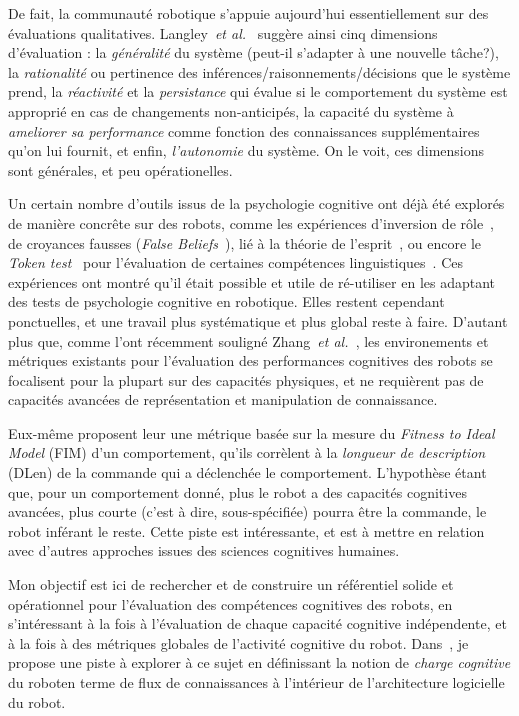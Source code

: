 \documentclass[a4paper]{article}
\newcommand{\etal}{{\textit{et al.~}}}
\begin{document}
De fait, la communauté robotique s'appuie aujourd'hui essentiellement sur des
évaluations qualitatives. Langley~\etal\cite{Langley2006} suggère ainsi cinq
dimensions d'évaluation : la \emph{généralité} du système (peut-il s'adapter à
une nouvelle tâche?), la \emph{rationalité} ou pertinence des
inférences/raisonnements/décisions que le système prend, la \emph{réactivité} et
la \emph{persistance} qui évalue si le comportement du système est approprié en
cas de changements non-anticipés, la capacité du système à \emph{ameliorer sa
performance} comme fonction des connaissances supplémentaires qu'on lui fournit,
et enfin, \emph{l'autonomie} du système. On le voit, ces dimensions sont
générales, et peu opérationelles.

Un certain nombre d'outils issus de la psychologie cognitive ont déjà été
explorés de manière concrête sur des robots, comme les expériences d'inversion
de rôle~\cite{Lallee2010b}, de croyances fausses (\emph{False
Beliefs}~\cite{Leslie2000}), lié à la théorie de l'esprit~\cite{Breazeal2006,
Warnier2012a, trafton2013act}, ou encore le \emph{Token
test}~\cite{DiSimoni1978} pour l'évaluation de certaines compétences
linguistiques~\cite{Mavridis2006}. Ces expériences ont montré qu'il était
possible et utile de ré-utiliser en les adaptant des tests de psychologie
cognitive en robotique. Elles restent cependant ponctuelles, et une travail plus
systématique et plus global reste à faire. D'autant plus que, comme l'ont
récemment souligné Zhang~\etal\cite{zhang2013evaluation}, les environements et
métriques existants pour l'évaluation des performances cognitives des robots se
focalisent pour la plupart sur des capacités physiques, et ne requièrent pas de
capacités avancées de représentation et manipulation de connaissance.

Eux-même proposent leur une métrique basée sur la mesure du \emph{Fitness to
Ideal Model} (FIM) d'un comportement, qu'ils corrèlent à la \emph{longueur de
description} (DLen) de la commande qui a déclenchée le comportement. L'hypothèse
étant que, pour un comportement donné, plus le robot a des capacités cognitives
avancées, plus courte (c'est à dire, sous-spécifiée) pourra être la commande, le
robot inférant le reste. Cette piste est intéressante, et est à mettre en
relation avec d'autres approches issues des sciences cognitives humaines.

Mon objectif est ici de rechercher et de construire un référentiel solide et
opérationnel pour l'évaluation des compétences cognitives des robots, en
s'intéressant à la fois à l'évaluation de chaque capacité cognitive
indépendente, et à la fois à des métriques globales de l'activité cognitive du
robot. Dans~\cite{lemaignan2013explicit}, je propose une piste à explorer à ce
sujet en définissant la notion de \emph{charge cognitive} du roboten terme de
flux de connaissances à l'intérieur de l'architecture logicielle du robot.
\end{document}
